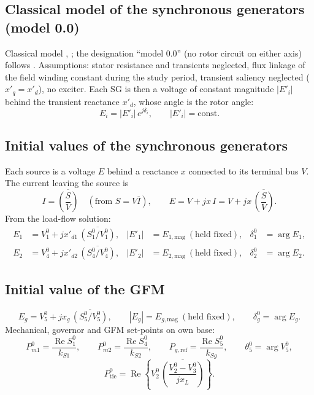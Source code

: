 \documentclass[11pt,a4paper]{article}
\numberwithin{equation}{section}
\newcommand{\cj}[1]{\overline{#1}}
\newcommand{\re}{\operatorname{Re}}
\begin{document}
\subsection{Classical model of the synchronous generators (model 0.0)}\label{sec:classical}
Classical model \cite{KothariNagrath2011}, \cite{SauerPai1998}; the designation ``model 0.0'' (no rotor circuit on either axis) follows \cite{IEEE1110}.
Assumptions: stator resistance and transients neglected, flux linkage of the field winding constant during the study period, transient saliency neglected ($x'_q = x'_d$), no exciter. Each SG is then a voltage of constant magnitude $|E'_i|$ behind the transient reactance $x'_d$, whose angle is the rotor angle:
\begin{equation}
\boxed{E_i = |E'_i|\,e^{j\delta_i},\qquad |E'_i| = \text{const.}}
\label{eq:classical}
\end{equation}

\subsection{Initial values of the synchronous generators}
Each source is a voltage $E$ behind a reactance $x$ connected to its terminal bus $V$. The current leaving the source is
\begin{equation}
I = \cj{\left(\frac{S}{V}\right)}\quad(\text{from } S = V\cj I),
\qquad
E = V + jx\,I = V + jx\,\cj{\left(\frac{S}{V}\right)} .
\end{equation}
From the load-flow solution:
\begin{align}
E_1 &= V_1^0 + jx'_{d1}\,\cj{(S_1^0/V_1^0)}, & |E'_1| &= E_{1,\text{mag}}\ (\text{held fixed}), & \delta_1^0 &= \arg E_1,\\
E_2 &= V_4^0 + jx'_{d2}\,\cj{(S_4^0/V_4^0)}, & |E'_2| &= E_{2,\text{mag}}\ (\text{held fixed}), & \delta_2^0 &= \arg E_2 .
\end{align}

\subsection{Initial value of the GFM}
\begin{equation}
E_g = V_5^0 + jx_g\,\cj{(S_5^0/V_5^0)},\qquad |E_g| = E_{g,\text{mag}}\ (\text{held fixed}),\qquad \delta_g^0 = \arg E_g .
\end{equation}
Mechanical, governor and GFM set-points on own base:
\begin{equation}
P_{m1}^0 = \frac{\re S_1^0}{k_{S1}},\qquad
P_{m2}^0 = \frac{\re S_4^0}{k_{S2}},\qquad
P_{g,\text{ref}} = \frac{\re S_5^0}{k_{Sg}},\qquad
\theta_5^0 = \arg V_5^0,
\end{equation}
\begin{equation}
P_{\text{tie}}^0 = \re\!\left\{V_2^0\,\cj{\left(\frac{V_2^0-V_3^0}{jx_L}\right)}\right\}.
\end{equation}
\end{document}
